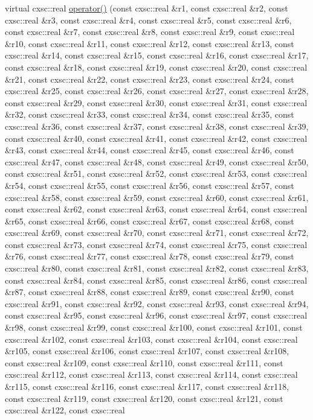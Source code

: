 \begin{DoxyCompactItemize}
virtual cxsc\-::real \hyperlink{classGaussianFobj1000D_ab8de306d468364bc26813512d37c1e3a}{operator()} (const cxsc\-::real \&r1, const cxsc\-::real \&r2, const cxsc\-::real \&r3, const cxsc\-::real \&r4, const cxsc\-::real \&r5, const cxsc\-::real \&r6, const cxsc\-::real \&r7, const cxsc\-::real \&r8, const cxsc\-::real \&r9, const cxsc\-::real \&r10, const cxsc\-::real \&r11, const cxsc\-::real \&r12, const cxsc\-::real \&r13, const cxsc\-::real \&r14, const cxsc\-::real \&r15, const cxsc\-::real \&r16, const cxsc\-::real \&r17, const cxsc\-::real \&r18, const cxsc\-::real \&r19, const cxsc\-::real \&r20, const cxsc\-::real \&r21, const cxsc\-::real \&r22, const cxsc\-::real \&r23, const cxsc\-::real \&r24, const cxsc\-::real \&r25, const cxsc\-::real \&r26, const cxsc\-::real \&r27, const cxsc\-::real \&r28, const cxsc\-::real \&r29, const cxsc\-::real \&r30, const cxsc\-::real \&r31, const cxsc\-::real \&r32, const cxsc\-::real \&r33, const cxsc\-::real \&r34, const cxsc\-::real \&r35, const cxsc\-::real \&r36, const cxsc\-::real \&r37, const cxsc\-::real \&r38, const cxsc\-::real \&r39, const cxsc\-::real \&r40, const cxsc\-::real \&r41, const cxsc\-::real \&r42, const cxsc\-::real \&r43, const cxsc\-::real \&r44, const cxsc\-::real \&r45, const cxsc\-::real \&r46, const cxsc\-::real \&r47, const cxsc\-::real \&r48, const cxsc\-::real \&r49, const cxsc\-::real \&r50, const cxsc\-::real \&r51, const cxsc\-::real \&r52, const cxsc\-::real \&r53, const cxsc\-::real \&r54, const cxsc\-::real \&r55, const cxsc\-::real \&r56, const cxsc\-::real \&r57, const cxsc\-::real \&r58, const cxsc\-::real \&r59, const cxsc\-::real \&r60, const cxsc\-::real \&r61, const cxsc\-::real \&r62, const cxsc\-::real \&r63, const cxsc\-::real \&r64, const cxsc\-::real \&r65, const cxsc\-::real \&r66, const cxsc\-::real \&r67, const cxsc\-::real \&r68, const cxsc\-::real \&r69, const cxsc\-::real \&r70, const cxsc\-::real \&r71, const cxsc\-::real \&r72, const cxsc\-::real \&r73, const cxsc\-::real \&r74, const cxsc\-::real \&r75, const cxsc\-::real \&r76, const cxsc\-::real \&r77, const cxsc\-::real \&r78, const cxsc\-::real \&r79, const cxsc\-::real \&r80, const cxsc\-::real \&r81, const cxsc\-::real \&r82, const cxsc\-::real \&r83, const cxsc\-::real \&r84, const cxsc\-::real \&r85, const cxsc\-::real \&r86, const cxsc\-::real \&r87, const cxsc\-::real \&r88, const cxsc\-::real \&r89, const cxsc\-::real \&r90, const cxsc\-::real \&r91, const cxsc\-::real \&r92, const cxsc\-::real \&r93, const cxsc\-::real \&r94, const cxsc\-::real \&r95, const cxsc\-::real \&r96, const cxsc\-::real \&r97, const cxsc\-::real \&r98, const cxsc\-::real \&r99, const cxsc\-::real \&r100, const cxsc\-::real \&r101, const cxsc\-::real \&r102, const cxsc\-::real \&r103, const cxsc\-::real \&r104, const cxsc\-::real \&r105, const cxsc\-::real \&r106, const cxsc\-::real \&r107, const cxsc\-::real \&r108, const cxsc\-::real \&r109, const cxsc\-::real \&r110, const cxsc\-::real \&r111, const cxsc\-::real \&r112, const cxsc\-::real \&r113, const cxsc\-::real \&r114, const cxsc\-::real \&r115, const cxsc\-::real \&r116, const cxsc\-::real \&r117, const cxsc\-::real \&r118, const cxsc\-::real \&r119, const cxsc\-::real \&r120, const cxsc\-::real \&r121, const cxsc\-::real \&r122, const cxsc\-::real 
\end{DoxyCompactItemize}
